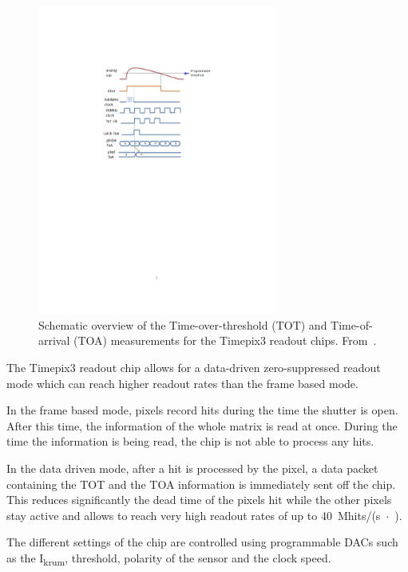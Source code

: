 \begin{figure}[htbp]
  \centering \includegraphics[width=0.7\textwidth, trim = 50mm 140mm
    60mm 50mm, clip]{figures/Calibration/TOT_TOA_explanation.pdf}
  \caption{Schematic overview of the Time-over-threshold (TOT) and
    Time-of-arrival (TOA) measurements for the Timepix3 readout
    chips. From~\cite{Timepix3Poikela}.}
  \label{fig:TOT_TOA_concept}
\end{figure}

The Timepix3 readout chip allows for a data-driven zero-suppressed
readout mode which can reach higher readout rates than the frame based
mode. 

In the frame based mode, pixels record hits during the time the
shutter is open. After this time, the information of the whole matrix
is read at once. During the time the information is being read, the
chip is not able to process any hits.
 
In the data driven mode, after a hit is processed by the pixel,
a data packet containing the TOT and the TOA information is
immediately sent off the chip. This reduces significantly the dead
time of the pixels hit while the other pixels stay active and allows
to reach very high readout rates of up to
40~Mhits/(s~$\cdot$~\cmsquared).

The different settings of the chip are controlled using programmable
DACs such as the I\textsubscript{krum}, threshold, polarity of the
sensor and the clock speed.



